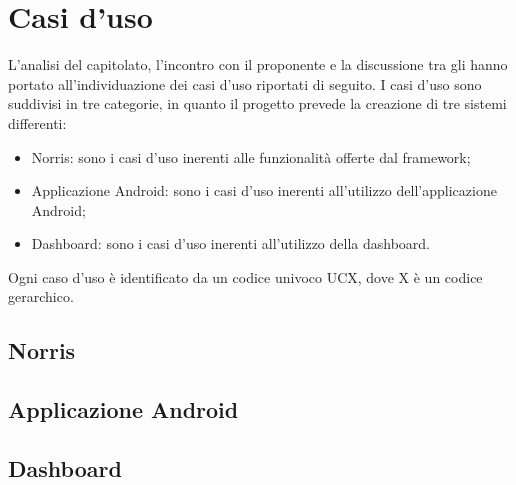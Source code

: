 \section{Casi d'uso}
L’analisi del capitolato, l’incontro con il proponente e la discussione tra gli  hanno portato all'individuazione dei casi d'uso riportati di seguito. 
I casi d'uso sono suddivisi in tre categorie, in quanto il progetto prevede la creazione di tre sistemi differenti:
\begin{itemize}
	\item Norris: sono i casi d'uso inerenti alle funzionalità offerte dal framework;
	\item Applicazione Android: sono i casi d'uso inerenti all'utilizzo dell'applicazione Android;
	\item Dashboard: sono i casi d'uso inerenti all'utilizzo della dashboard.
\end{itemize}
Ogni caso d'uso è identificato da un codice univoco UCX, dove X è un codice gerarchico.
\subsection{Norris}


\subsection{Applicazione Android}


\subsection{Dashboard}

